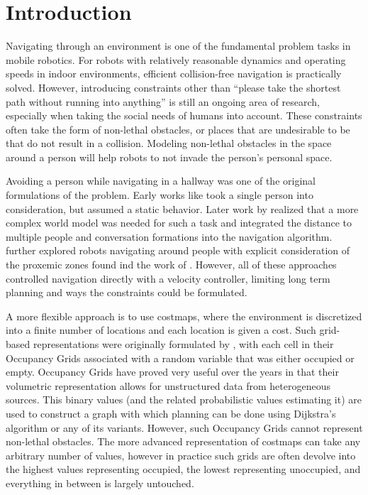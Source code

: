 \section{Introduction}
Navigating through an environment is one of the fundamental problem tasks in mobile robotics. For robots with relatively reasonable dynamics and operating speeds in indoor environments, efficient collision-free navigation is practically solved. However, introducing constraints other than ``please take the shortest path without running into anything'' is still an ongoing area of research, especially when taking the social needs of humans into account. These constraints often take the form of non-lethal obstacles, or places that are undesirable to be that do not result in a collision. Modeling non-lethal obstacles in the space around a person will help robots to not invade the person's personal space. 

Avoiding a person while navigating in a hallway was one of the original formulations of the problem. Early works like \citet{yoda1997} took a single person into consideration, but assumed a static behavior. Later work by \citet{christensen2004} realized that a more complex world model was needed for such a task and integrated the distance to multiple people and conversation formations into the navigation algorithm. 
\citet{christensen2005} further explored robots navigating around people with explicit consideration of the proxemic zones found ind the work of \citet{hall1969}. However, all of these approaches controlled navigation directly with a velocity controller, limiting long term planning and ways the constraints could be formulated. 

A more flexible approach is to use costmaps, where the environment is discretized into a finite number of locations and each location is given a cost. Such grid-based representations were originally formulated by \citet{matthies1988}, with each cell in their Occupancy Grids associated with a random variable that was either occupied or empty. Occupancy Grids have proved very useful over the years in that their volumetric representation allows for unstructured data from heterogeneous sources. This binary values (and the related probabilistic values estimating it) are used to construct a graph with which planning can be done using Dijkstra's algorithm or any of its variants. However, such Occupancy Grids cannot represent non-lethal obstacles. The more advanced representation of costmaps can take any arbitrary number of values, however in practice such grids are often devolve into the highest values representing occupied, the lowest representing unoccupied, and everything in between is largely untouched. 

